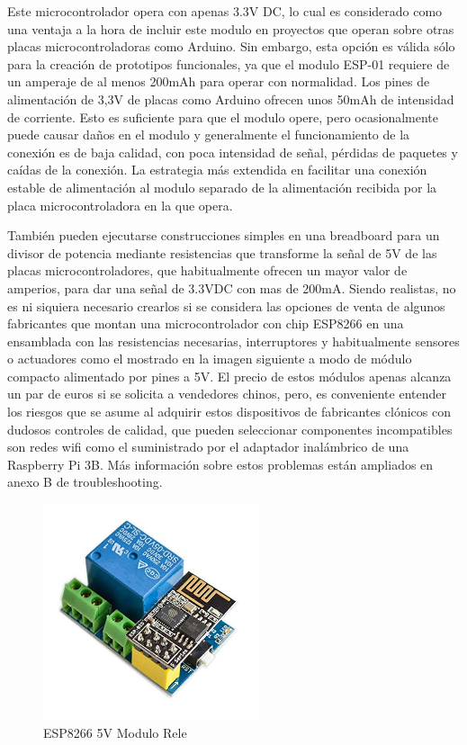 Este microcontrolador opera con apenas 3.3V DC, lo cual es considerado como una ventaja a la hora de incluir este modulo en proyectos que operan sobre otras placas microcontroladoras como Arduino. Sin embargo, esta opción es válida sólo para la creación de prototipos funcionales, ya que el modulo ESP-01 requiere de un amperaje de al menos 200mAh para operar con normalidad. Los pines de alimentación de 3,3V de placas como Arduino ofrecen unos 50mAh de intensidad de corriente. Esto es suficiente para que el modulo opere, pero ocasionalmente puede causar daños en el modulo y generalmente el funcionamiento de la conexión es de baja calidad, con poca intensidad de señal, pérdidas de paquetes y caídas de la conexión. La estrategia más extendida en facilitar una conexión estable de alimentación al modulo separado de la alimentación recibida por la placa microcontroladora en la que opera.

\vspace{1cm}

También pueden ejecutarse construcciones simples en una breadboard para un divisor de potencia mediante resistencias que transforme la señal de 5V de las placas microcontroladores, que habitualmente ofrecen un mayor valor de amperios, para dar una señal de 3.3VDC con mas de 200mA. Siendo realistas, no es ni siquiera necesario crearlos si se considera las opciones de venta de algunos fabricantes que montan una microcontrolador con chip ESP8266 en una ensamblada con las resistencias necesarias, interruptores y habitualmente sensores o actuadores como el mostrado en la imagen siguiente a modo de módulo compacto alimentado por pines a 5V. El precio de estos módulos apenas alcanza un par de euros si se solicita a vendedores chinos, pero, es conveniente entender los riesgos que se asume al adquirir estos dispositivos de fabricantes clónicos con dudosos controles de calidad, que pueden seleccionar componentes incompatibles son redes \gls{wifi} como el suministrado por el adaptador inalámbrico de una Raspberry Pi 3B. Más información sobre estos problemas están ampliados en anexo B de troubleshooting.

\begin{figure}[hbt!]
\centering
\includegraphics[height=2.5in]{figures/esp8266exRele.jpg}
\caption[ESP-01S con rele]{ESP8266 5V Modulo Rele\footnotemark}
\end{figure}

